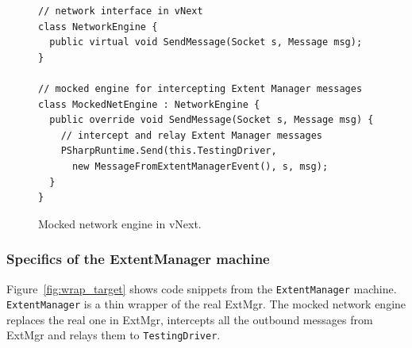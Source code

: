 \begin{figure}[t]
\begin{lstlisting}
// network interface in vNext
class NetworkEngine {
  public virtual void SendMessage(Socket s, Message msg);
}

// mocked engine for intercepting Extent Manager messages
class MockedNetEngine : NetworkEngine {
  public override void SendMessage(Socket s, Message msg) {
    // intercept and relay Extent Manager messages
    PSharpRuntime.Send(this.TestingDriver,
      new MessageFromExtentManagerEvent(), s, msg);
  }
}
\end{lstlisting}
\vspace{-2mm}
\caption{Mocked network engine in vNext.}
\label{fig:enginecode}
\end{figure}



\subsubsection{Specifics of the ExtentManager machine}

Figure~\ref{fig:wrap_target} shows code snippets from the \texttt{ExtentManager} \psharp machine. \texttt{ExtentManager} is a thin wrapper of the real ExtMgr. The mocked network engine replaces the real one in ExtMgr, intercepts all the outbound messages from ExtMgr and relays them to \texttt{TestingDriver}.

